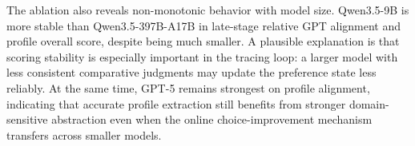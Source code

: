 The ablation also reveals non-monotonic behavior with model size. Qwen3.5-9B is more stable
than Qwen3.5-397B-A17B in late-stage relative GPT alignment and profile overall score,
despite being much smaller. A plausible explanation is that scoring stability is especially
important in the tracing loop: a larger model with less consistent comparative judgments may
update the preference state less reliably. At the same time, GPT-5 remains strongest on
profile alignment, indicating that accurate profile extraction still benefits from stronger
domain-sensitive abstraction even when the online choice-improvement mechanism transfers
across smaller models.
